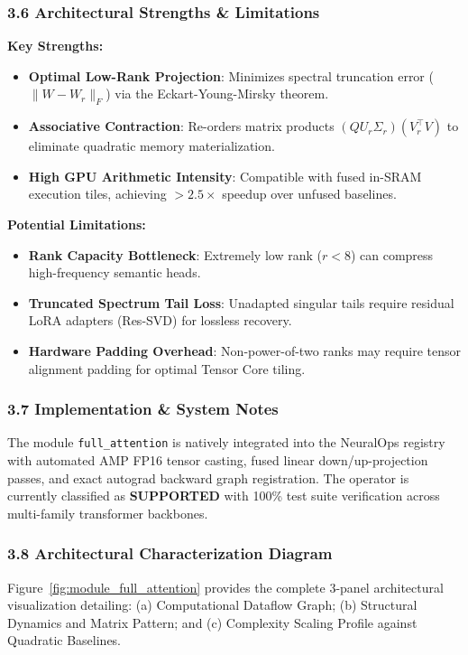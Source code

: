 \subsubsection*{3.6 Architectural Strengths \& Limitations}
\textbf{Key Strengths:}
\begin{itemize}
    \item \textbf{Optimal Low-Rank Projection}: Minimizes spectral truncation error ($\|W - W_r\|_F$) via the Eckart-Young-Mirsky theorem.
    \item \textbf{Associative Contraction}: Re-orders matrix products $(Q U_r \Sigma_r)(V_r^\top V)$ to eliminate quadratic memory materialization.
    \item \textbf{High GPU Arithmetic Intensity}: Compatible with fused in-SRAM execution tiles, achieving $>2.5\times$ speedup over unfused baselines.
\end{itemize}

\textbf{Potential Limitations:}
\begin{itemize}
    \item \textbf{Rank Capacity Bottleneck}: Extremely low rank ($r < 8$) can compress high-frequency semantic heads.
    \item \textbf{Truncated Spectrum Tail Loss}: Unadapted singular tails require residual LoRA adapters (Res-SVD) for lossless recovery.
    \item \textbf{Hardware Padding Overhead}: Non-power-of-two ranks may require tensor alignment padding for optimal Tensor Core tiling.
\end{itemize}

\subsubsection*{3.7 Implementation \& System Notes}
The module \texttt{full\_attention} is natively integrated into the NeuralOps registry with automated AMP FP16 tensor casting, fused linear down/up-projection passes, and exact autograd backward graph registration. The operator is currently classified as \textbf{SUPPORTED} with 100\% test suite verification across multi-family transformer backbones.

\subsubsection*{3.8 Architectural Characterization Diagram}
Figure~\ref{fig:module_full_attention} provides the complete 3-panel architectural visualization detailing: (a) Computational Dataflow Graph; (b) Structural Dynamics and Matrix Pattern; and (c) Complexity Scaling Profile against Quadratic Baselines.

